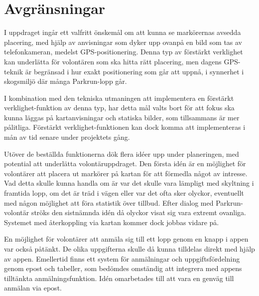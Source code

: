 \section{Avgränsningar}
I uppdraget ingår ett valfritt önskemål om att kunna se markörernas avsedda placering, med hjälp av anvisningar som dyker upp ovanpå en bild som tas av telefonkameran, medelst GPS-positionering. 
Denna typ av förstärkt verklighet kan underlätta för volontären som ska hitta rätt placering, men dagens GPS-teknik är begränsad i hur exakt positionering som går att uppnå, i synnerhet i skogsmiljö där många Parkrun-lopp går.

I kombination med den tekniska utmaningen att implementera en förstärkt verklighet-funktion av denna typ, har detta mål valts bort för att fokus ska kunna läggas på kartanvisningar och statiska bilder, som tillsammans är mer pålitliga. 
Förstärkt verklighet-funktionen kan dock komma att implementeras i mån av tid senare under projektets gång.

Utöver de beställda funktionerna dök flera idéer upp under planeringen, med potential att underlätta %
volontäruppdraget.
Den första idén är en möjlighet för volontärer att placera ut markörer på kartan för att förmedla något av intresse. 
Vad detta skulle kunna handla om är var det skulle vara lämpligt med skyltning i framtida lopp, om det är träd i vägen eller var det ofta sker olyckor, eventuellt med någon möjlighet att föra statistik över tillbud.
Efter dialog med Parkrun-volontär ströks den sistnämnda idén då olyckor visat sig vara extremt ovanliga.
Systemet med återkoppling via kartan kommer dock jobbas vidare på.

En möjlighet för volontärer att anmäla sig till ett lopp genom en knapp i appen var också påtänkt. 
De olika uppgifterna skulle då kunna tilldelas direkt med hjälp av appen. 
Emellertid finns ett system för anmälningar och uppgiftsfördelning genom epost och tabeller, som bedömdes omständig att integrera med appens tilltänkta anmälningsfunktion.
Idén omarbetades till att vara en genväg till anmälan via epost.
